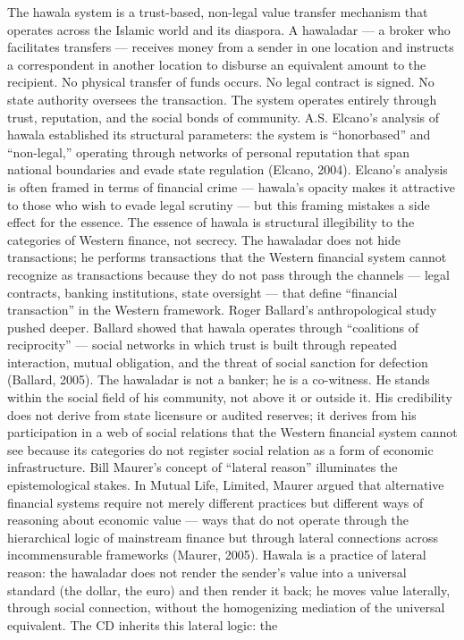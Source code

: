 The hawala system is a trust-based, non-legal value transfer mechanism that operates across the Islamic world and its diaspora. A hawaladar — a broker who facilitates transfers — receives money from a sender in one location and instructs a correspondent in another location to disburse an equivalent amount to the recipient. No physical transfer of funds occurs. No legal contract is signed. No state authority oversees the transaction. The system operates entirely through trust, reputation, and the social bonds of community. A.S. Elcano’s analysis of hawala established its structural parameters: the system is “honorbased” and “non-legal,” operating through networks of personal reputation that span national boundaries and evade state regulation (Elcano, 2004). Elcano’s analysis is often framed in terms of financial crime — hawala’s opacity makes it attractive to those who wish to evade legal scrutiny — but this framing mistakes a side effect for the essence. The essence of hawala is structural illegibility to the categories of Western finance, not secrecy. The hawaladar does not hide transactions; he performs transactions that the Western financial system cannot recognize as transactions because they do not pass through the channels — legal contracts, banking institutions, state oversight — that define “financial transaction” in the Western framework. Roger Ballard’s anthropological study pushed deeper. Ballard showed that hawala operates through “coalitions of reciprocity” — social networks in which trust is built through repeated interaction, mutual obligation, and the threat of social sanction for defection (Ballard, 2005). The hawaladar is not a banker; he is a co-witness. He stands within the social field of his community, not above it or outside it. His credibility does not derive from state licensure or audited reserves; it derives from his participation in a web of social relations that the Western financial system cannot see because its categories do not register social relation as a form of economic infrastructure. Bill Maurer’s concept of “lateral reason” illuminates the epistemological stakes. In Mutual Life, Limited, Maurer argued that alternative financial systems require not merely different practices but different ways of reasoning about economic value — ways that do not operate through the hierarchical logic of mainstream finance but through lateral connections across incommensurable frameworks (Maurer, 2005). Hawala is a practice of lateral reason: the hawaladar does not render the sender’s value into a universal standard (the dollar, the euro) and then render it back; he moves value laterally, through social connection, without the homogenizing mediation of the universal equivalent. The CD inherits this lateral logic: the

